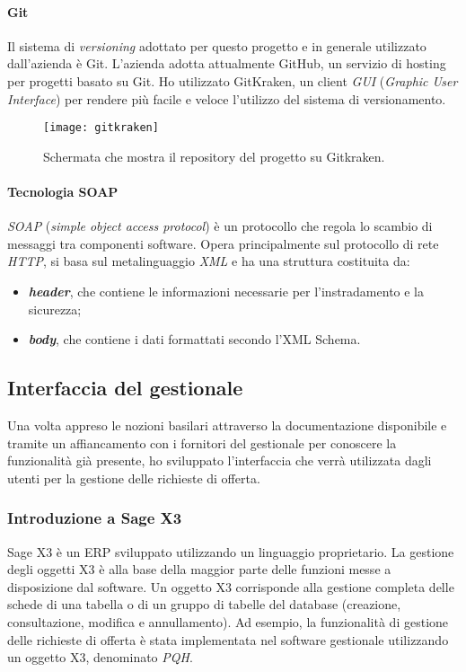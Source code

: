 \paragraph{Git}
Il sistema di \textit{versioning} adottato per questo progetto e in generale utilizzato dall'azienda è Git.
L'azienda adotta attualmente GitHub, un servizio di hosting per progetti basato su Git.
Ho utilizzato GitKraken, un client \textit{GUI} (\textit{Graphic User Interface}) per rendere più facile e veloce l'utilizzo del sistema di versionamento.

\begin{figure}[htbp]
	\begin{center}
		\texttt{[image: gitkraken]}
		\caption{Schermata che mostra il repository del progetto su Gitkraken.}
	\end{center}
\end{figure}


\paragraph{Tecnologia SOAP}
\textit{SOAP} (\textit{simple object access protocol}) è un protocollo che regola lo scambio di messaggi tra componenti software. Opera principalmente sul protocollo di rete \textit{HTTP}, si basa sul metalinguaggio \textit{XML} e ha una struttura costituita da:
\begin{itemize}
	\item \textit{\textbf{header}}, che contiene le informazioni necessarie per l'instradamento e la sicurezza; 
	\item \textit{\textbf{body}}, che contiene i dati formattati secondo l'XML Schema.
\end{itemize}




\subsection{Interfaccia del gestionale}
Una volta appreso le nozioni basilari attraverso la documentazione disponibile e tramite un affiancamento con i fornitori del gestionale per conoscere la funzionalità già
presente, ho sviluppato l'interfaccia che verrà utilizzata dagli utenti per la gestione delle richieste di offerta.

\subsubsection{Introduzione a Sage X3}
Sage X3 è un ERP sviluppato utilizzando un linguaggio proprietario.
La gestione degli oggetti X3 è alla base della maggior parte delle funzioni messe a disposizione dal software.
Un oggetto X3 corrisponde alla gestione completa delle schede di una tabella o di un gruppo di tabelle del database (creazione, consultazione, modifica e annullamento).
Ad esempio, la funzionalità di gestione delle richieste di offerta è stata implementata nel software gestionale utilizzando un oggetto X3, denominato \textit{PQH}.

